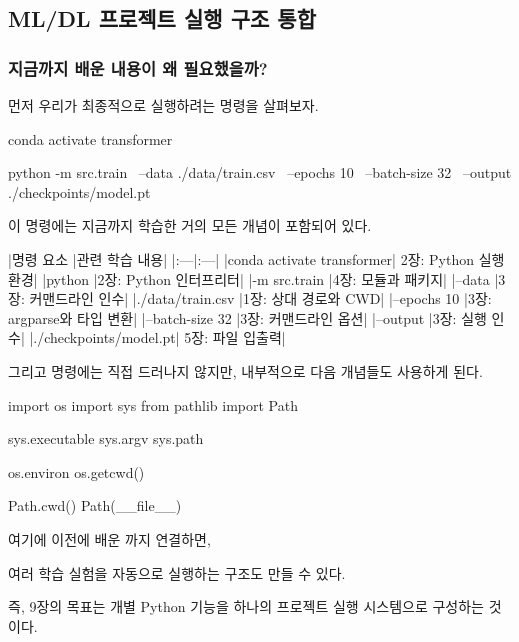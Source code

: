 

\subsection{ML/DL 프로젝트 실행 구조 통합}

\subsubsection{지금까지 배운 내용이 왜 필요했을까?}

먼저 우리가 최종적으로 실행하려는 명령을 살펴보자.

\begin{dhkzsh}
conda activate transformer

python -m src.train \
    --data ./data/train.csv \
    --epochs 10 \
    --batch-size 32 \
    --output ./checkpoints/model.pt
\end{dhkzsh}

이 명령에는 지금까지 학습한 거의 모든 개념이 포함되어 있다.

\begin{dhktable}
|명령 요소	|관련 학습 내용|
|:---|:---|
|conda activate transformer|	2장: Python 실행 환경|
|python	|2장: Python 인터프리터|
|-m src.train	|4장: 모듈과 패키지|
|--data	|3장: 커맨드라인 인수|
|./data/train.csv	|1장: 상대 경로와 CWD|
|--epochs 10	|3장: argparse와 타입 변환|
|--batch-size 32	|3장: 커맨드라인 옵션|
|--output	|3장: 실행 인수|
|./checkpoints/model.pt|	5장: 파일 입출력|
\end{dhktable}

그리고 명령에는 직접 드러나지 않지만, 내부적으로 다음 개념들도 사용하게 된다.

\begin{dhkcode}
import os
import sys
from pathlib import Path

sys.executable
sys.argv
sys.path

os.environ
os.getcwd()

Path.cwd()
Path(__file__)
\end{dhkcode}

여기에 이전에 배운 까지 연결하면,

여러 학습 실험을 자동으로 실행하는 구조도 만들 수 있다.

즉, 9장의 목표는 개별 Python 기능을 하나의 프로젝트 실행 시스템으로 구성하는 것이다.

